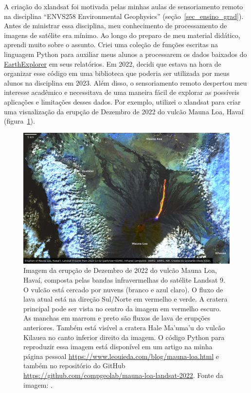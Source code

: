 \documentclass[10pt,a4paper,oneside]{book}
\begin{document}
A criação do xlandsat foi motivada pelas minhas aulas de sensoriamento
remoto na disciplina ``ENVS258 Environmental Geophysics''
(seção~\ref{sec_ensino_grad}).
Antes de ministrar essa disciplina, meu conhecimento de processamento de
imagens de satélite era mínimo.
Ao longo do preparo de meu material didático, aprendi muito sobre o assunto.
Criei uma coleção de funções escritas na linguagem Python para auxiliar meus
alunos a processarem os dados baixados do
\href{https://earthexplorer.usgs.gov/}{EarthExplorer} em seus relatórios.
Em 2022, decidi que estava na hora de organizar esse código em uma biblioteca
que poderia ser utilizada por meus alunos na disciplina em 2023.
Além disso, o sensoriamento remoto despertou meu interesse acadêmico e
necessitava de uma maneira fácil de explorar as possíveis aplicações e
limitações desses dados.
Por exemplo, utilizei o xlandsat para criar uma visualização da erupção de
Dezembro de 2022 do vulcão Mauna Loa, Havaí (figura~\ref{fig_maunaloa}).

\begin{figure}[tb]
  \begin{center}
    \includegraphics[width=\textwidth]{images/mauna-loa-landsat-2022-12-02.jpg}
  \end{center}
  \caption{
    Imagem da erupção de Dezembro de 2022 do vulcão Mauna Loa, Havaí, composta
    pelas bandas infravermelhas do satélite Landsat 9.
    O vulcão está cercado por nuvens (branco e azul claro). O fluxo de lava
    atual está na direção Sul/Norte em vermelho e verde. A cratera principal
    pode ser vista no centro da imagem em vermelho escuro.
    As manchas em marrom e preto são fluxos de lava de erupções anteriores.
    Também está visível a cratera Hale Ma'uma'u do vulcão Kīlauea no canto
    inferior direito da imagem.
    O código Python para reproduzir essa imagem está disponível em um artigo na
    minha página pessoal \url{https://www.leouieda.com/blog/mauna-loa.html} e
    também no repositório do GitHub
    \url{https://github.com/compgeolab/mauna-loa-landsat-2022}.
    Fonte da imagem: \citet[][CC0]{Uieda2022maunaloa}.
  }
  \label{fig_maunaloa}
\end{figure}
\end{document}
